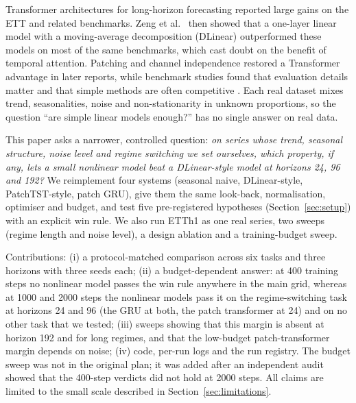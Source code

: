 Transformer architectures for long-horizon forecasting \cite{zhou2020informer,wu2021autoformer} reported large gains on the ETT and related benchmarks. Zeng et al.\ \cite{zeng2022are} then showed that a one-layer linear model with a moving-average decomposition (DLinear) outperformed these models on most of the same benchmarks, which cast doubt on the benefit of temporal attention. Patching and channel independence \cite{nie2022time} restored a Transformer advantage in later reports, while benchmark studies found that evaluation details matter and that simple methods are often competitive \cite{qiu2024tfb}. Each real dataset mixes trend, seasonalities, noise and non-stationarity in unknown proportions, so the question ``are simple linear models enough?'' has no single answer on real data.

This paper asks a narrower, controlled question: \emph{on series whose trend, seasonal structure, noise level and regime switching we set ourselves, which property, if any, lets a small nonlinear model beat a DLinear-style model at horizons 24, 96 and 192?} We reimplement four systems (seasonal naive, DLinear-style, PatchTST-style, patch GRU), give them the same look-back, normalisation, optimiser and budget, and test five pre-registered hypotheses (Section~\ref{sec:setup}) with an explicit win rule. We also run ETTh1 \cite{zhou2020informer} as one real series, two sweeps (regime length and noise level), a design ablation and a training-budget sweep.

Contributions: (i) a protocol-matched comparison across six tasks and three horizons with three seeds each; (ii) a budget-dependent answer: at 400 training steps no nonlinear model passes the win rule anywhere in the main grid, whereas at 1000 and 2000 steps the nonlinear models pass it on the regime-switching task at horizons 24 and 96 (the GRU at both, the patch transformer at 24) and on no other task that we tested; (iii) sweeps showing that this margin is absent at horizon 192 and for long regimes, and that the low-budget patch-transformer margin depends on noise; (iv) code, per-run logs and the run registry. The budget sweep was not in the original plan; it was added after an independent audit showed that the 400-step verdicts did not hold at 2000 steps. All claims are limited to the small scale described in Section~\ref{sec:limitations}.
